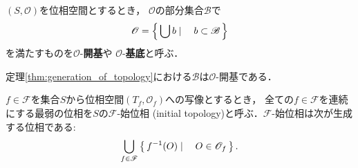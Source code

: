 	\begin{screen}
		\begin{dfn}[開基]
			$(S,\mathscr{O})$を位相空間とするとき，
			$\mathscr{O}$の部分集合$\mathscr{B}$で
			\begin{align}
				\mathscr{O} = \left\{\, \bigcup b \mid \quad b \subset \mathscr{B}\, \right\}
			\end{align}
			を満たすものを$\mathscr{O}$-{\bf 開基}や
			$\mathscr{O}$-{\bf 基底}と呼ぶ．
		\end{dfn}
	\end{screen}
	
	定理\ref{thm:generation_of_topology}における$\mathscr{B}$は$\mathscr{O}$-開基である．
	
	
	\begin{screen}
		\begin{thm}[Alexanderの準基底定理]
		\end{thm}
	\end{screen}
	
	\begin{screen}
		\begin{dfn}[始位相]
			$f \in \mathscr{F}$を集合$S$から位相空間$(T_f,\mathscr{O}_f)$への写像とするとき，
			全ての$f \in \mathscr{F}$を連続にする最弱の位相を$S$の$\mathscr{F}$-始位相
			(initial topology)と呼ぶ．$\mathscr{F}$-始位相は次が生成する位相である:
			\begin{align}
				\bigcup_{f \in \mathscr{F}} \left\{\, f^{-1}(O) \mid \quad O \in \mathscr{O}_f\, \right\}.
			\end{align}
		\end{dfn}
	\end{screen}
	
	\begin{screen}
		\begin{dfn}[Cartesian積の位相]
			
		\end{dfn}
	\end{screen}
	
	\begin{screen}
		\begin{dfn}[直積の位相]
			
		\end{dfn}
	\end{screen}